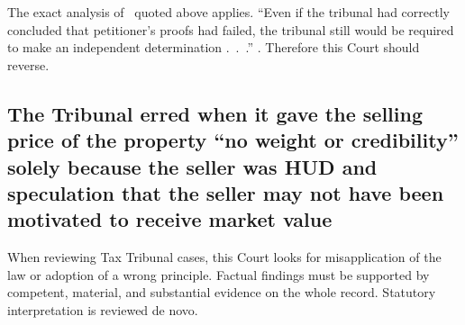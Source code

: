 \documentclass[12pt,\documentclassflag]{michiganCourtOfAppealsBrief}
\begin{document}
The exact analysis of \cite[s]{Jones & Laughlin}\ quoted above applies. ``Even if the tribunal had correctly concluded that petitioner's proofs had failed, the tribunal still would be required to make an independent determination .~.~.'' . Therefore this Court should reverse.






\subsection{The Tribunal erred when it gave the selling price of the property ``no weight or credibility'' solely because the seller was HUD and speculation that the seller may not have been motivated to receive market value}

When reviewing Tax Tribunal cases, this Court looks for misapplication of the law or adoption of a wrong principle. Factual findings must be supported by competent, material, and substantial evidence on the whole record. Statutory interpretation is reviewed de novo. 

\end{document}
